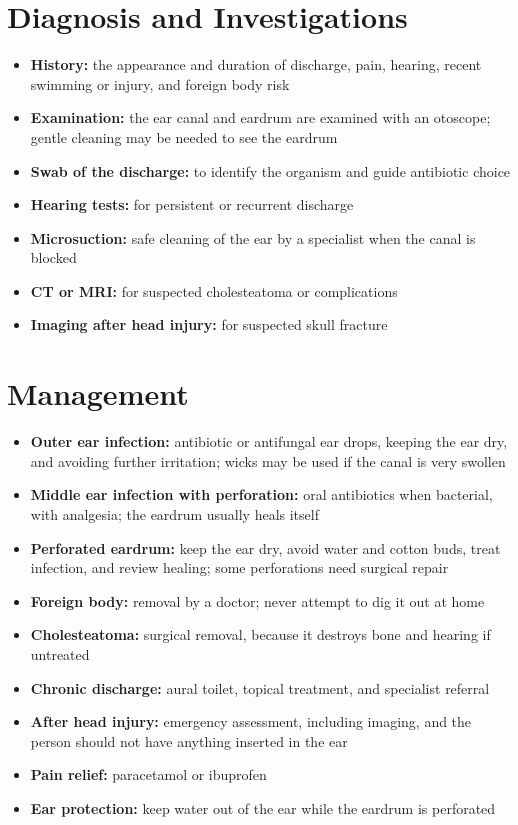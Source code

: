 \section*{Diagnosis and Investigations}
\begin{itemize}
    \item \textbf{History:} the appearance and duration of discharge, pain, hearing, recent swimming or injury, and foreign body risk
    \item \textbf{Examination:} the ear canal and eardrum are examined with an otoscope; gentle cleaning may be needed to see the eardrum
    \item \textbf{Swab of the discharge:} to identify the organism and guide antibiotic choice
    \item \textbf{Hearing tests:} for persistent or recurrent discharge
    \item \textbf{Microsuction:} safe cleaning of the ear by a specialist when the canal is blocked
    \item \textbf{CT or MRI:} for suspected cholesteatoma or complications
    \item \textbf{Imaging after head injury:} for suspected skull fracture
\end{itemize}

\section*{Management}
\begin{itemize}
    \item \textbf{Outer ear infection:} antibiotic or antifungal ear drops, keeping the ear dry, and avoiding further irritation; wicks may be used if the canal is very swollen
    \item \textbf{Middle ear infection with perforation:} oral antibiotics when bacterial, with analgesia; the eardrum usually heals itself
    \item \textbf{Perforated eardrum:} keep the ear dry, avoid water and cotton buds, treat infection, and review healing; some perforations need surgical repair
    \item \textbf{Foreign body:} removal by a doctor; never attempt to dig it out at home
    \item \textbf{Cholesteatoma:} surgical removal, because it destroys bone and hearing if untreated
    \item \textbf{Chronic discharge:} aural toilet, topical treatment, and specialist referral
    \item \textbf{After head injury:} emergency assessment, including imaging, and the person should not have anything inserted in the ear
    \item \textbf{Pain relief:} paracetamol or ibuprofen
    \item \textbf{Ear protection:} keep water out of the ear while the eardrum is perforated
\end{itemize}

